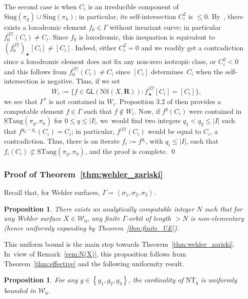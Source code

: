 \documentclass[11pt]{article}
\let\sep :
\newcommand{\set}[1]{\left\{#1\right\}}
\newcommand{\bset}[1]{\bigl\{#1\bigr\}}
\newcommand{\abs}[1]{\left\vert#1\right\vert}
\newcommand{\bra}[1]{\left\langle #1\right\rangle}
\def\R{\mathbf{R}}
\newcommand{\cW}{\mathcal{W}}
\newcommand{\NS}{{\mathrm{NS}}}
\newcommand{\Sing}{{\mathrm{Sing}}}
\newcommand{\STang}{{\mathrm{STang}}}
\newcommand{\NT}{{\mathrm{NT}}}
\newcommand\GL{{\mathsf{GL}}}
\theoremstyle{plain}
\newtheorem{pro}[thm]{Proposition}
\theoremstyle{definition}
\numberwithin{equation}{section}
\begin{document}
The second case is when $C_i$ is an irreducible component of $\Sing(\pi_g)\cup\Sing(\pi_h)$;
in particular, its self-intersection $C_i^2$ is $\leq 0$.
By~\cite[Th.\,D]{finite_orbits}, there exists a loxodromic element $f_0\in \Gamma$
without invariant curve; in particular $f_0^{\abs{I}!}(C_i) \neq C_i$. Since $f_0$ is loxodromic, this inequation is equivalent to
$(f_0^{\abs{I}!})_\varstar [C_i] \neq [C_i]$. Indeed, either $C_i^2=0$ and we readily get a contradiction
since a loxodromic element does not fix any non-zero isotropic class, or $C_i^2<0$
and this follows from $f_0^{\abs{I}!}(C_i) \neq C_i$ since
$[C_i]$ determines~$C_i$ when the self-intersection is negative.
Thus, if we set
\begin{equation*}
W_i:=\bset{f\in \GL(\NS(X, \R))\sep f^{\abs{I}!}_\varstar [C_i] = [C_i]},
\end{equation*}
we see that $\Gamma^*$ is not contained in $W_i$. Proposition 3.2 of \cite{eskin-mozes-oh} then provides a computable element $f\in \Gamma$
such that $f\notin W_i$. Now, if $f^q(C_i)$ were contained in $\STang(\pi_g, \pi_h)$ for $0\leq q\leq \vert I\vert$, we~would find two integers $q_1< q_2\leq \vert I\vert$ such that $f^{q_2-q_1}(C_i)=C_i$; in particular, $f^{\vert I\vert !}(C_i)$ would be equal to $C_i$, a contradiction. Thus, there is an iterate $f_i:=f^{q_i}$, with $q_i \leq \vert I\vert$, such that $f_i(C_i)\not \subset \STang(\pi_g, \pi_h)$, and the proof is complete.
\qed

\subsubsection{Proof of Theorem~\ref{thm:wehler_zariski} }\label{par:proof_of_9.3}
Recall that, for Wehler surfaces, $\Gamma = \bra{\sigma_1, \sigma_2, \sigma_3}$.

\begin{pro}\label{pro:N(X)_bounded}
There exists an analytically computable integer $N$ such that for
any Wehler surface $X\in { \cW}_0$, any
finite $\Gamma$-orbit of length $>N$ is non-elementary (hence uniformly expanding by Theorem~\ref{thm:finite_UE}).
\end{pro}

This uniform bound is the main step towards Theorem~\ref{thm:wehler_zariski}. In~view of Remark~\ref{rem:N(X)}, this proposition
follows from Theorem~\ref{thm:effective} and the following uniformity result.

\begin{pro}\label{pro:NT_bounded}
For any $g\in \set{g_1, g_2, g_3}$, the cardinality of $\NT_g$ is uniformly bounded
in $\cW_0$.
\end{pro}
\end{document}
